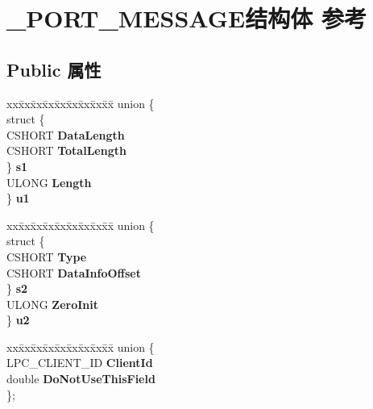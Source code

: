 \hypertarget{struct___p_o_r_t___m_e_s_s_a_g_e}{}\section{\+\_\+\+P\+O\+R\+T\+\_\+\+M\+E\+S\+S\+A\+G\+E结构体 参考}
\label{struct___p_o_r_t___m_e_s_s_a_g_e}
\subsection*{Public 属性}
\begin{DoxyCompactItemize}
\item 
\mbox{\label{struct___p_o_r_t___m_e_s_s_a_g_e_afef7123ba43bf3d8e826f1dc663c83f3}} 
\begin{tabbing}
xx\=xx\=xx\=xx\=xx\=xx\=xx\=xx\=xx\=\kill
union \{\\
\>struct \{\\
\>\>CSHORT {\bfseries DataLength}\\
\>\>CSHORT {\bfseries TotalLength}\\
\>\} {\bfseries s1}\\
\>ULONG {\bfseries Length}\\
\} {\bfseries u1}\\

\end{tabbing}\item 
\mbox{\label{struct___p_o_r_t___m_e_s_s_a_g_e_a3f70cc39747c96e121c14e55d63b92b1}} 
\begin{tabbing}
xx\=xx\=xx\=xx\=xx\=xx\=xx\=xx\=xx\=\kill
union \{\\
\>struct \{\\
\>\>CSHORT {\bfseries Type}\\
\>\>CSHORT {\bfseries DataInfoOffset}\\
\>\} {\bfseries s2}\\
\>ULONG {\bfseries ZeroInit}\\
\} {\bfseries u2}\\

\end{tabbing}\item 
\mbox{\label{struct___p_o_r_t___m_e_s_s_a_g_e_a157a3db4ea144a7a00259fbe31efe1be}} 
\begin{tabbing}
xx\=xx\=xx\=xx\=xx\=xx\=xx\=xx\=xx\=\kill
union \{\\
\>LPC\_CLIENT\_ID {\bfseries ClientId}\\
\>double {\bfseries DoNotUseThisField}\\
\}; \\


\end{tabbing}
\end{DoxyCompactItemize}
